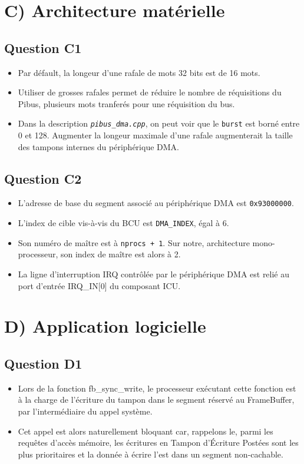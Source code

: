 \documentclass[10pt]{article}
\begin{document}
\section{C) Architecture matérielle}

\subsection{Question C1}

\begin{itemize}
  \item Par défault, la longeur d'une rafale de mots 32 bits est de 16 mots.
  \item Utiliser de grosses rafales permet de réduire le nombre de réquisitions
  du Pibus, plusieurs mots tranferés pour une réquisition du bus.
  \item Dans la description \textit{\texttt{pibus\_dma.cpp}}, on peut voir que
  le \texttt{burst} est borné entre 0 et 128. Augmenter la longeur maximale
  d'une rafale augmenterait la taille des tampons internes du périphérique DMA.
\end{itemize}
\subsection{Question C2}
\begin{itemize}
  \item L'adresse de base du segment associé au périphérique DMA est
  \texttt{0x93000000}.
  \item L'index de cible vis-à-vis du BCU est \texttt{DMA\_INDEX}, égal à 6.
  \item Son numéro de maître est à \texttt{nprocs + 1}. Sur notre, architecture
  mono-processeur, son index de maître est alors à 2.
  \item La ligne d'interruption IRQ contrôlée par le périphérique DMA est relié
  au port d'entrée IRQ\_IN[0] du composant ICU.
\end{itemize}

\section{D) Application logicielle}
\subsection{Question D1}
\begin{itemize}
  \item Lors de la fonction fb\_sync\_write, le processeur exécutant cette
  fonction est à la charge de l'écriture du tampon dans le segment réservé
  au FrameBuffer, par l'intermédiaire du appel système.
  \item Cet appel est alors naturellement bloquant car, rappelons le, parmi
  les requêtes d'accès mémoire, les écritures en Tampon d'Écriture Postées sont
  les plus prioritaires et la donnée à écrire l'est dans un segment non-cachable.
\end{itemize}
\end{document}
